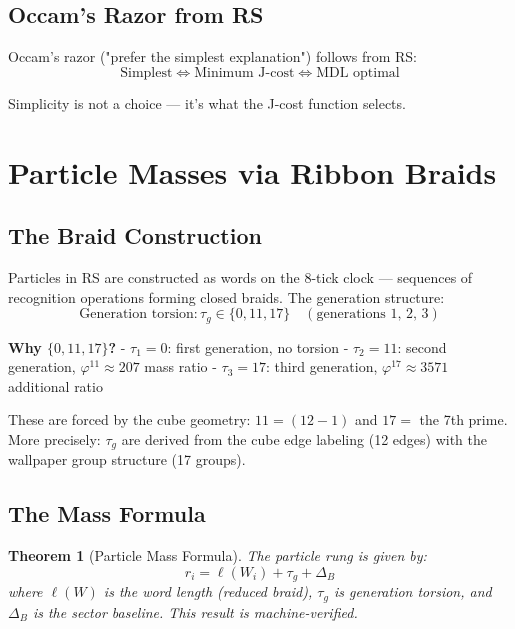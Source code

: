 \documentclass[12pt,a4paper]{article}
\newtheorem{theorem}{Theorem}[section]
\theoremstyle{definition}
\theoremstyle{remark}
\begin{document}
\subsection{Occam's Razor from RS}

Occam's razor ("prefer the simplest explanation") follows from RS:
\begin{equation}
\text{Simplest} \iff \text{Minimum J-cost} \iff \text{MDL optimal}
\end{equation}

Simplicity is not a choice — it's what the J-cost function selects.

\section{Particle Masses via Ribbon Braids}

\subsection{The Braid Construction}

Particles in RS are constructed as words on the 8-tick clock — sequences of 
recognition operations forming closed braids. The generation structure:
\begin{equation}
\text{Generation torsion}: \tau_g \in \{0, 11, 17\} \quad (\text{generations 1, 2, 3})
\end{equation}

\textbf{Why $\{0, 11, 17\}$?}
- $\tau_1 = 0$: first generation, no torsion
- $\tau_2 = 11$: second generation, $\varphi^{11} \approx 207$ mass ratio
- $\tau_3 = 17$: third generation, $\varphi^{17} \approx 3571$ additional ratio

These are forced by the cube geometry: $11 = (12 - 1)$ and $17 = $ the 7th prime.
More precisely: $\tau_g$ are derived from the cube edge labeling (12 edges) with 
the wallpaper group structure (17 groups).

\subsection{The Mass Formula}

\begin{theorem}[Particle Mass Formula]
\label{thm:particlemass}
The particle rung is given by:
\begin{equation}
r_i = \ell(W_i) + \tau_g + \Delta_B
\end{equation}
where $\ell(W)$ is the word length (reduced braid), $\tau_g$ is generation torsion, 
and $\Delta_B$ is the sector baseline.
This result is machine-verified.
\end{theorem}
\end{document}
